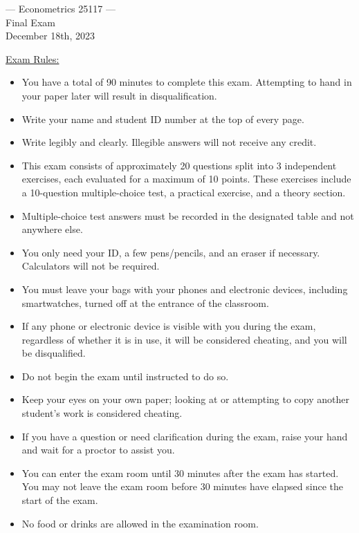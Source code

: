 \documentclass{article}
\begin{document}
\begin{center}
{\Large --- Econometrics 25117 --- \\[1em] Final Exam \\[1em] \small{December 18th, 2023}}\bigskip 
\end{center}
\vspace{1cm}
\underline{Exam Rules:}
\begin{itemize}
    \item You have a total of 90 minutes to complete this exam. Attempting to hand in your paper later will result in disqualification.
    \item Write your name and student ID number at the top of every page.
    \item Write legibly and clearly. Illegible answers will not receive any credit.
    \item This exam consists of approximately 20 questions split into 3 independent exercises, each evaluated for a maximum of 10 points. These exercises include a 10-question multiple-choice test, a practical exercise, and a theory section.
    \item Multiple-choice test answers must be recorded in the designated table and not anywhere else.
    \item You only need your ID, a few pens/pencils, and an eraser if necessary. Calculators will not be required.
    \item You must leave your bags with your phones and electronic devices, including smartwatches, turned off at the entrance of the classroom.
    \item If any phone or electronic device is visible with you during the exam, regardless of whether it is in use, it will be considered cheating, and you will be disqualified.
    \item Do not begin the exam until instructed to do so.
    \item Keep your eyes on your own paper; looking at or attempting to copy another student's work is considered cheating.
    \item If you have a question or need clarification during the exam, raise your hand and wait for a proctor to assist you.
    \item You can enter the exam room until 30 minutes after the exam has started. You may not leave the exam room before 30 minutes have elapsed since the start of the exam.
    \item No food or drinks are allowed in the examination room.
\end{itemize}
\end{document}
